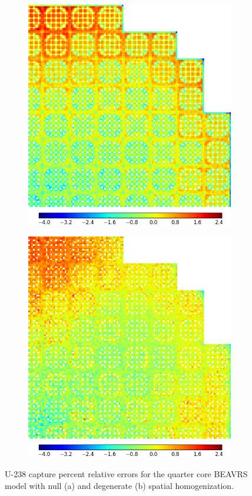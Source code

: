 \begin{figure}[h!]
\centering
\begin{subfigure}{0.9\textwidth}
  \centering
  \includegraphics[width=0.65\linewidth]{figures/results/spatial/full-core/capt-err-null}
  \caption{}
  \label{fig:chap11-full-core-capt-err-null}
\end{subfigure}
\begin{subfigure}{0.9\textwidth}
  \centering
\includegraphics[width=0.65\linewidth]{figures/results/spatial/full-core/capt-err-degenerate}
  \caption{}
  \label{fig:chap11-full-core-capt-err-degenerate}
\end{subfigure}
\caption[U-238 capture rate error spatial distributions]{U-238 capture percent relative errors for the quarter core \ac{BEAVRS} model with null (a) and degenerate (b) spatial homogenization.}
\label{fig:chap11-full-core-capt-err-a}
\end{figure}


